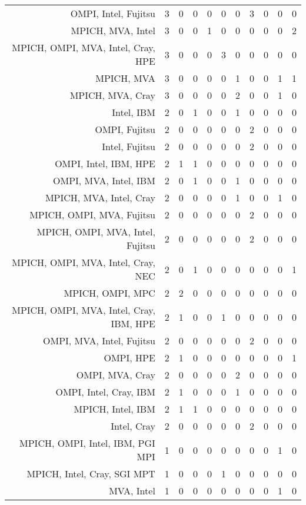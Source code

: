 {\begin{landscape}
\begin{longtable}[htb]{r|c|c|c|c|c|c|c|c|c|c}
{OMPI, Intel, Fujitsu} & 3 & 0 & 0 & 0 & 0 & 0 & 3 & 0 & 0 & 0 \\%
{MPICH, MVA, Intel} & 3 & 0 & 0 & 1 & 0 & 0 & 0 & 0 & 0 & 2 \\%
{MPICH, OMPI, MVA, Intel, Cray, HPE} & 3 & 0 & 0 & 0 & 3 & 0 & 0 & 0 & 0 & 0 \\%
{MPICH, MVA} & 3 & 0 & 0 & 0 & 0 & 1 & 0 & 0 & 1 & 1 \\%
{MPICH, MVA, Cray} & 3 & 0 & 0 & 0 & 0 & 2 & 0 & 0 & 1 & 0 \\%
{Intel, IBM} & 2 & 0 & 1 & 0 & 0 & 1 & 0 & 0 & 0 & 0 \\%
{OMPI, Fujitsu} & 2 & 0 & 0 & 0 & 0 & 0 & 2 & 0 & 0 & 0 \\%
{Intel, Fujitsu} & 2 & 0 & 0 & 0 & 0 & 0 & 2 & 0 & 0 & 0 \\%
{OMPI, Intel, IBM, HPE} & 2 & 1 & 1 & 0 & 0 & 0 & 0 & 0 & 0 & 0 \\%
{OMPI, MVA, Intel, IBM} & 2 & 0 & 1 & 0 & 0 & 1 & 0 & 0 & 0 & 0 \\%
{MPICH, MVA, Intel, Cray} & 2 & 0 & 0 & 0 & 0 & 1 & 0 & 0 & 1 & 0 \\%
{MPICH, OMPI, MVA, Fujitsu} & 2 & 0 & 0 & 0 & 0 & 0 & 2 & 0 & 0 & 0 \\%
{MPICH, OMPI, MVA, Intel, Fujitsu} & 2 & 0 & 0 & 0 & 0 & 0 & 2 & 0 & 0 & 0 \\%
{MPICH, OMPI, MVA, Intel, Cray, NEC} & 2 & 0 & 1 & 0 & 0 & 0 & 0 & 0 & 0 & 1 \\%
{MPICH, OMPI, MPC} & 2 & 2 & 0 & 0 & 0 & 0 & 0 & 0 & 0 & 0 \\%
{MPICH, OMPI, MVA, Intel, Cray, IBM, HPE} & 2 & 1 & 0 & 0 & 1 & 0 & 0 & 0 & 0 & 0 \\%
{OMPI, MVA, Intel, Fujitsu} & 2 & 0 & 0 & 0 & 0 & 0 & 2 & 0 & 0 & 0 \\%
{OMPI, HPE} & 2 & 1 & 0 & 0 & 0 & 0 & 0 & 0 & 0 & 1 \\%
{OMPI, MVA, Cray} & 2 & 0 & 0 & 0 & 0 & 2 & 0 & 0 & 0 & 0 \\%
{OMPI, Intel, Cray, IBM} & 2 & 1 & 0 & 0 & 0 & 1 & 0 & 0 & 0 & 0 \\%
{MPICH, Intel, IBM} & 2 & 1 & 1 & 0 & 0 & 0 & 0 & 0 & 0 & 0 \\%
{Intel, Cray} & 2 & 0 & 0 & 0 & 0 & 0 & 2 & 0 & 0 & 0 \\%
{MPICH, OMPI, Intel, IBM, PGI MPI} & 1 & 0 & 0 & 0 & 0 & 0 & 0 & 0 & 1 & 0 \\%
{MPICH, Intel, Cray, SGI MPT} & 1 & 0 & 0 & 0 & 1 & 0 & 0 & 0 & 0 & 0 \\%
{MVA, Intel} & 1 & 0 & 0 & 0 & 0 & 0 & 0 & 0 & 1 & 0 \\%

\end{longtable}
\end{landscape}}

